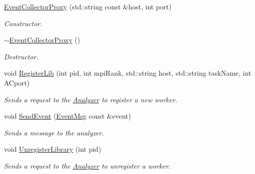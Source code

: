 \begin{DoxyCompactItemize}
\item 
\hypertarget{class_d_m_lib_1_1_event_collector_proxy_a363b2b90626f1d08102b6628a65b61a1}{\hyperlink{class_d_m_lib_1_1_event_collector_proxy_a363b2b90626f1d08102b6628a65b61a1}{Event\-Collector\-Proxy} (std\-::string const \&host, int port)}\label{class_d_m_lib_1_1_event_collector_proxy_a363b2b90626f1d08102b6628a65b61a1}

\begin{DoxyCompactList}\small\item\em Constructor. \end{DoxyCompactList}\item 
\hypertarget{class_d_m_lib_1_1_event_collector_proxy_a6a43500ceae0fc7bcf3bf958e1e0689b}{\hyperlink{class_d_m_lib_1_1_event_collector_proxy_a6a43500ceae0fc7bcf3bf958e1e0689b}{$\sim$\-Event\-Collector\-Proxy} ()}\label{class_d_m_lib_1_1_event_collector_proxy_a6a43500ceae0fc7bcf3bf958e1e0689b}

\begin{DoxyCompactList}\small\item\em Destructor. \end{DoxyCompactList}\item 
\hypertarget{class_d_m_lib_1_1_event_collector_proxy_a2e030001e9d2649f020f02455aa5ebea}{void \hyperlink{class_d_m_lib_1_1_event_collector_proxy_a2e030001e9d2649f020f02455aa5ebea}{Register\-Lib} (int pid, int mpi\-Rank, std\-::string host, std\-::string task\-Name, int A\-Cport)}\label{class_d_m_lib_1_1_event_collector_proxy_a2e030001e9d2649f020f02455aa5ebea}

\begin{DoxyCompactList}\small\item\em Sends a request to the \hyperlink{class_analyzer}{Analyzer} to register a new worker. \end{DoxyCompactList}\item 
\hypertarget{class_d_m_lib_1_1_event_collector_proxy_a3c35713deece278377a1f265af7e1371}{void \hyperlink{class_d_m_lib_1_1_event_collector_proxy_a3c35713deece278377a1f265af7e1371}{Send\-Event} (\hyperlink{class_common_1_1_event_msg}{Event\-Msg} const \&event)}\label{class_d_m_lib_1_1_event_collector_proxy_a3c35713deece278377a1f265af7e1371}

\begin{DoxyCompactList}\small\item\em Sends a message to the analyzer. \end{DoxyCompactList}\item 
\hypertarget{class_d_m_lib_1_1_event_collector_proxy_ab65910277b0b1a35011f0a8b945417f0}{void \hyperlink{class_d_m_lib_1_1_event_collector_proxy_ab65910277b0b1a35011f0a8b945417f0}{Unregister\-Library} (int pid)}\label{class_d_m_lib_1_1_event_collector_proxy_ab65910277b0b1a35011f0a8b945417f0}

\begin{DoxyCompactList}\small\item\em Sends a request to the \hyperlink{class_analyzer}{Analyzer} to unregister a worker. \end{DoxyCompactList}\end{DoxyCompactItemize}


